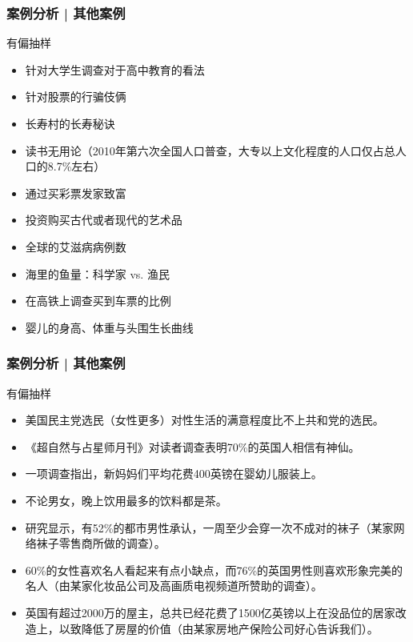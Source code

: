 \begin{frame}
  \frametitle{案例分析 | 其他案例}
  \begin{block}{有偏抽样}
    \begin{itemize}
      \item 针对大学生调查对于高中教育的看法
      \item 针对股票的行骗伎俩
      \item 长寿村的长寿秘诀
      \item 读书无用论（2010年第六次全国人口普查，大专以上文化程度的人口仅占总人口的8.7\%左右）
      \item 通过买彩票发家致富
      \item 投资购买古代或者现代的艺术品
      \item 全球的艾滋病病例数
      \item 海里的鱼量：科学家 vs. 渔民
      \item 在高铁上调查买到车票的比例
      \item 婴儿的身高、体重与头围生长曲线
    \end{itemize}
  \end{block}
\end{frame}



\begin{frame}
  \frametitle{案例分析 | 其他案例}
  \begin{block}{有偏抽样}
    \begin{itemize}
      \item 美国民主党选民（女性更多）对性生活的满意程度比不上共和党的选民。
      \item 《超自然与占星师月刊》对读者调查表明70\%的英国人相信有神仙。
      \item 一项调查指出，新妈妈们平均花费400英镑在婴幼儿服装上。
      \item 不论男女，晚上饮用最多的饮料都是茶。
      \item 研究显示，有52\%的都市男性承认，一周至少会穿一次不成对的袜子（某家网络袜子零售商所做的调查）。
      \item 60\%的女性喜欢名人看起来有点小缺点，而76\%的英国男性则喜欢形象完美的名人（由某家化妆品公司及高画质电视频道所赞助的调查）。
      \item 英国有超过2000万的屋主，总共已经花费了1500亿英镑以上在没品位的居家改造上，以致降低了房屋的价值（由某家房地产保险公司好心告诉我们）。
    \end{itemize}
  \end{block}
\end{frame}

